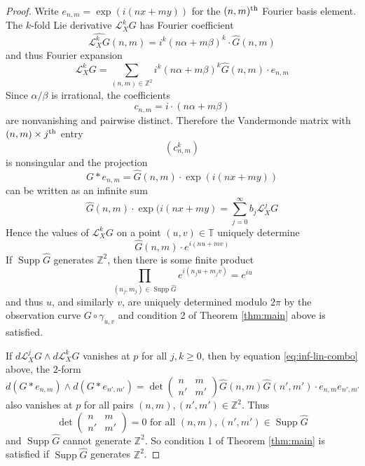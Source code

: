 \documentclass[11pt]{article}
\theoremstyle{definition}
\theoremstyle{remark}
\newcommand{\RR}{\mathbb{R}}
\newcommand{\ZZ}{\mathbb{Z}}
\newcommand{\TT}{\mathbb{T}}
\newcommand{\Ld}{\mathcal{L}}
\newcommand{\ts}{\textsuperscript}
\DeclareMathOperator{\Supp}{Supp}
\begin{document}
    \begin{proof}\label{pf:fourier}
    Write $e_{n,m} = \exp(i(nx+my))$ for the $(n,m)\ts{th}$ Fourier basis element. The $k$-fold Lie derivative $\mathcal{L}_X^kG$ has Fourier coefficient
    \[\widehat{\mathcal{L}_X^kG}(n,m) = i^k(n\alpha + m\beta)^k\cdot \hat{G}(n,m)\]
    and thus Fourier expansion
    \[\mathcal{L}_X^kG = \sum_{(n,m) \in \ZZ^2} i^k(n\alpha + m\beta)^k\hat{G}(n,m)\cdot e_{n,m}\]
    Since $\alpha/\beta$ is irrational, the coefficients
    \[c_{n,m} = i\cdot(n\alpha + m\beta)\]
    are nonvanishing and pairwise distinct. Therefore the Vandermonde matrix with $(n,m)\times j\ts{th}$ entry
    \[(c_{n,m}^k)\]
    is nonsingular and the projection
    \[G*e_{n,m} = \hat{G}(n,m)\cdot \exp(i(nx+my))\]
    can be written as an infinite sum
    \begin{equation}\label{eq:inf-lin-combo}\hat{G}(n,m)\cdot \exp( i(nx+my) = \sum_{j=0}^\infty b_j\Ld_X^jG\end{equation}
    Hence the values of $\Ld_X^kG$ on a point $(u,v)\in \TT$ uniquely determine
    \[\hat{G}(n,m)\cdot e^{i(nu+mv)}\]
    If $\Supp\hat{G}$ generates $\ZZ^2$, then there is some finite product
    \[\prod_{(n_j,m_j)\in \Supp\hat{G}}e^{i(n_ju+m_jv)} = e^{iu}\]
    and thus $u$, and similarly $v$, are uniquely determined modulo $2\pi$ by the observation curve $G\circ\gamma_{u,v}$ and condition 2 of Theorem \ref{thm:main} above is satisfied.

    If $d\Ld_X^jG\wedge d\Ld_X^kG$ vanishes at $p$ for all $j,k\geq 0$, then by equation \ref{eq:inf-lin-combo} above, the $2$-form
    \[d(G*e_{n,m})\wedge d(G*e_{n',m'}) = \det\begin{pmatrix}n & m \\n' & m'\end{pmatrix}\hat{G}(n,m)\hat{G}(n',m')\cdot e_{n,m} e_{n',m'}\]
    also vanishes at $p$ for all pairs $(n,m), (n',m')\in \ZZ^2$. Thus
    \[\det\begin{pmatrix}n & m \\n' & m'\end{pmatrix} = 0 \textrm{  for all $(n,m), (n',m') \in \Supp \hat{G}$}\]
    and $\Supp\hat{G}$ cannot generate $\ZZ^2$. So condition 1 of Theorem \ref{thm:main} is satisfied if $\Supp\hat{G}$ generates $\ZZ^2$.


\end{proof}
\end{document}
